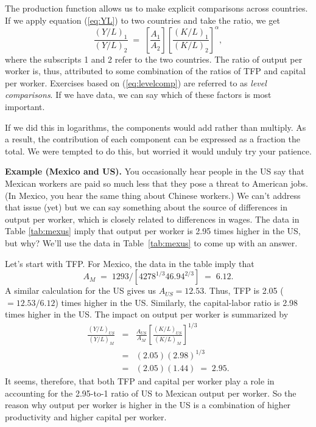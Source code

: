 The production function allows us to make explicit
comparisons across countries.  If we apply equation (\ref{eq:YL})
to two countries  and take the ratio, we get
\begin{equation}
    \frac{(Y/L)_1}{(Y/L)_2} \;=\;
             \left[ \frac{A_1}{A_2} \right]
             \left[ \frac{(K/L)_1}{(K/L)_2} \right]^\alpha ,
        \label{eq:levelcomp}
\end{equation}
where the subscripts 1 and 2 refer to the two countries.
The ratio of output per worker is, thus, attributed to
some combination of the ratios of
TFP and capital per worker.
Exercises based on (\ref{eq:levelcomp}) are referred to as
{\it level comparisons\/}.
If we have data, we can say which of these factors is most important.

If we did this in logarithms, the components would add rather than multiply.
As a result, the contribution of each component can be expressed as a 
fraction the total.
We were tempted to do this, but worried it would unduly try your patience. 


\textbf{Example (Mexico and US).} You occasionally hear
people in the US say that Mexican workers are paid so much less
that they pose a threat to American jobs. (In Mexico, you hear the
same thing about Chinese workers.) We can't address that issue (yet) but we can say something about the source of differences
in output per worker, which is closely related to differences in
wages. The data in Table \ref{tab:mexus} imply that output per
worker is 2.95 times higher in the US, but why?
We'll use the data in Table~\ref{tab:mexus} to come up with an answer.

Let's start with TFP.
For Mexico, the data in the table imply that
\[
    A_M \;=\; 1293 / [ 4278^{1/3} 46.94^{2/3} ] \;=\; 6.12.
\]
A similar calculation for the US gives us $A_{US} = 12.53$.
Thus, TFP is 2.05 ($= 12.53/6.12$) times higher in the US.
Similarly, the capital-labor ratio is 2.98 times higher in the US.
The impact on output per worker is summarized by
\begin{eqnarray*}
     \frac{(Y/L)_{US}}{(Y/L)_{M}}  &=&  \frac{A_{US}}{A_M}
                        \left[ \frac{(K/L)_{US}}{(K/L)_{M}} \right]^{1/3} \\
                         &=&   (2.05) (2.98)^{1/3} \\ %
                         &=&   (2.05) (1.44) \;=\; 2.95 . %
\end{eqnarray*}
It seems, therefore, that both TFP and capital per
worker play a role in accounting
 for the
2.95-to-1 ratio of US to Mexican output per worker.
So the reason why output per worker is higher in the US is a
combination of higher productivity and
higher capital per worker.

